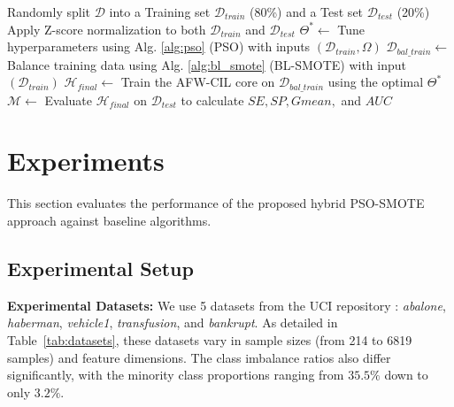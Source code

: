 \documentclass[pdflatex,sn-mathphys-num]{sn-jnl}%
\theoremstyle{thmstyleone}%
\theoremstyle{thmstyletwo}
\theoremstyle{thmstylethree}
\begin{document}
\begin{algorithm}[H]
	\small
\caption{Proposed Hybrid Approach: BL-SMOTE+PSO-AFW-CIL}
\label{alg:hybrid_approach}
Randomly split $\mathcal{D}$ into a Training set $\mathcal{D}_{train}$ (80\%) and a Test set $\mathcal{D}_{test}$ (20\%)\;
Apply Z-score normalization to both $\mathcal{D}_{train}$ and $\mathcal{D}_{test}$\;
$\Theta^* \leftarrow$ Tune hyperparameters using Alg. \ref{alg:pso} (PSO) with inputs $(\mathcal{D}_{train}, \Omega)$\; 
$\mathcal{D}_{bal\_train} \leftarrow$ Balance training data using Alg. \ref{alg:bl_smote} (BL-SMOTE) with input $(\mathcal{D}_{train})$\;
$\mathcal{H}_{final} \leftarrow$ Train the AFW-CIL core on $\mathcal{D}_{bal\_train}$ using the optimal $\Theta^*$\;
$\mathcal{M} \leftarrow$ Evaluate $\mathcal{H}_{final}$ on $\mathcal{D}_{test}$ to calculate $SE, SP, Gmean,$ and $AUC$\;
\;
\end{algorithm}

\section{Experiments}\label{sec4}
This section evaluates the performance of the proposed hybrid PSO-SMOTE approach against baseline algorithms.

\subsection{Experimental Setup}\label{subsec4_1}
\noindent \textbf{Experimental Datasets:} We use 5 datasets from the UCI repository \cite{dua2017uci}: \textit{abalone}, \textit{haberman}, \textit{vehicle1}, \textit{transfusion}, and \textit{bankrupt}. As detailed in Table~\ref{tab:datasets}, these datasets vary in sample sizes (from 214 to 6819 samples) and feature dimensions. The class imbalance ratios also differ significantly, with the minority class proportions ranging from $35.5\%$ down to only $3.2\%$.
\end{document}
